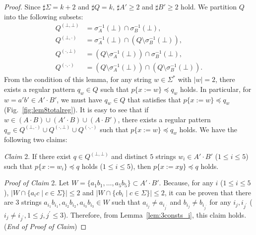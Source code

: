 \begin{proof}
Since $\sharp \Sigma = k + 2$ and $\sharp Q = k$, $\sharp A' \geq 2$ and $\sharp B' \geq 2$ hold.
We partition $Q$ into the following subsets:
\begin{align*}
  Q^{(\bot,\bot)} & = \sigma_{A}^{-1}(\bot) \cap \sigma_{B}^{-1}(\bot),\\
  Q^{(\bot,\cdot)} & = \sigma_{A}^{-1}(\bot) \cap (Q\setminus \sigma_{B}^{-1}(\bot)),\\
  Q^{(\cdot,\bot)} & = (Q\setminus \sigma_{A}^{-1}(\bot)) \cap \sigma_{B}^{-1}(\bot),\\
  Q^{(\cdot,\cdot)} & = (Q\setminus \sigma_{A}^{-1}(\bot)) \cap (Q\setminus \sigma_{B}^{-1}(\bot)).
\end{align*}
From the condition of this lemma, for any string $w \in \Sigma^{\ast}$ with $|w|=2$, there exists a regular pattern $q_{w} \in Q$ such that $p \{ x:=w \} \preceq q_{w}$ holds.
In particular, for $w=a'b'\in A'\cdot B'$, we must have $q_{w} \in Q$ that satisfies that $p \{ x:=w \} \preceq q_{w}$ (Fig.~\ref{fig:lem8totalreg}).
It is easy to see that if $w \in (A\cdot B) \cup (A'\cdot B) \cup (A\cdot B')$, there exists a regular pattern $q_{w} \in Q^{(\bot,\cdot)} \cup Q^{(\cdot,\bot)} \cup Q^{(\cdot,\cdot)}$ such that $p \{ x:=w \} \preceq q_{w}$ holds.
We have the following two claims:
\smallskip

\noindent
\textit{Claim} 2. If there exist $q \in Q^{(\bot,\bot)}$ and distinct $5$ strings $w_{i} \in A'\cdot B'$ ($1\leq i\leq 5$) such  that $p \{ x:=w_{i} \} \preceq q$ holds ($1\leq i\leq 5$),  then $p \{ x:=xy \} \preceq q$ holds.

\smallskip

\noindent
\textit{Proof of Claim} 2.
Let $W = \{a_{1}b_{1},\ldots,a_{5}b_{5}\} \subset A'\cdot B'$.
Because, for any $i$ ($1\leq i\leq 5$), $|W \cap \{a_{i}c \mid c \in \Sigma\}| \leq 2$ and  $|W \cap \{cb_{i} \mid c \in \Sigma\}| \leq 2$, it can be proven that there are $3$ strings $a_{i_{1}}b_{i_{1}},a_{i_{2}}b_{i_{2}},a_{i_{3}}b_{i_{3}}\in W$ such that $a_{i_{j}} \not= a_{i_{j^{\prime}}}$ and $b_{i_{j}} \not= b_{i_{j^{\prime}}}$ for any $i_{j},i_{j^{\prime}}$ ($i_{j}\not= i_{j^{\prime}}, 1\leq j,j^{\prime}\leq 3$).
Therefore, from Lemma~\ref{lem:3consts_i}, this claim holds. (\textit{End of Proof of Claim})


\end{proof}
